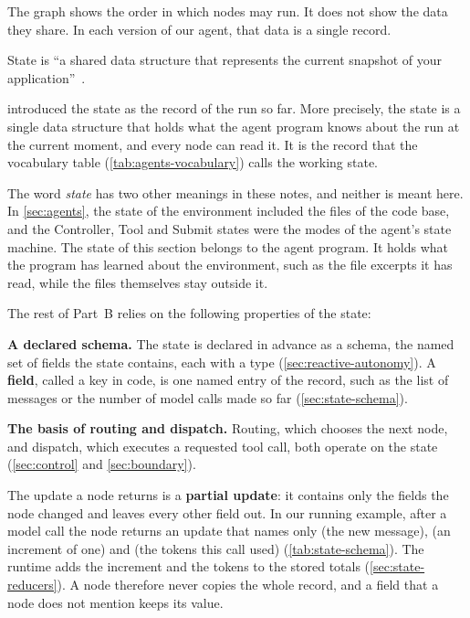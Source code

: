 The graph shows the order in which nodes may run. It does not show the data they share. In each
version of our agent, that data is a single record.

\begin{definition}[State]
\label{def:state-state}
State is ``a shared data structure that represents the current snapshot of your
application''~\citep{langgraph-graph-api}.
\end{definition}

 introduced the state as the record of the run so far. More precisely, the state
is a single data structure that holds what the agent program knows about the run at the current
moment, and every node can read it. It is the record that the vocabulary table
(\cref{tab:agents-vocabulary}) calls the working state.

The word \emph{state} has two other meanings in these notes, and neither is meant here. In
\cref{sec:agents}, the state of the environment included the files of the code base, and the
Controller, Tool and Submit states were the modes of the agent's state machine. The state of this
section belongs to the agent program. It holds what the program has learned about the environment,
such as the file excerpts it has read, while the files themselves stay outside it.

The rest of Part~B relies on the following properties of the state:
\bi
\item \textbf{A declared schema.} The state is declared in advance as a schema, the named set of
fields the state contains, each with a type (\cref{sec:reactive-autonomy}). A \textbf{field}, called a key
in code, is one named entry of the record, such as the list of messages or the number of model
calls made so far (\cref{sec:state-schema}).
\item \textbf{The basis of routing and dispatch.} Routing, which chooses the next node, and
dispatch, which executes a requested tool call, both operate on the state (\cref{sec:control} and
\cref{sec:boundary}).
\ei

The update a node returns is a \textbf{partial update}: it contains only the fields the node
changed and leaves every other field out. In our running example, after a model call the
 node returns an update that names only  (the new message),
 (an increment of one) and  (the tokens this call used)
(\cref{tab:state-schema}). The runtime adds the increment and the tokens to the stored totals
(\cref{sec:state-reducers}). A node therefore never copies the whole record, and a field that a node
does not mention keeps its value.

